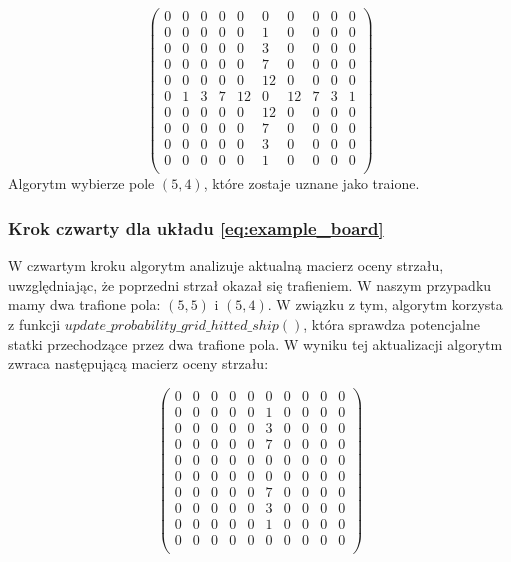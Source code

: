 \documentclass[magisterska]{pracadypl}
\begin{document}
$$
\begin{pmatrix}
0 & 0 & 0 & 0 & 0 & 0 & 0 & 0 & 0 & 0 \\
0 & 0 & 0 & 0 & 0 & 1 & 0 & 0 & 0 & 0 \\
0 & 0 & 0 & 0 & 0 & 3 & 0 & 0 & 0 & 0 \\
0 & 0 & 0 & 0 & 0 & 7 & 0 & 0 & 0 & 0 \\
0 & 0 & 0 & 0 & 0 & 12 & 0 & 0 & 0 & 0 \\
0 & 1 & 3 & 7 & 12 & 0 & 12 & 7 & 3 & 1 \\
0 & 0 & 0 & 0 & 0 & 12 & 0 & 0 & 0 & 0 \\
0 & 0 & 0 & 0 & 0 & 7 & 0 & 0 & 0 & 0 \\
0 & 0 & 0 & 0 & 0 & 3 & 0 & 0 & 0 & 0 \\
0 & 0 & 0 & 0 & 0 & 1 & 0 & 0 & 0 & 0 \\
\end{pmatrix}
$$
Algorytm wybierze pole $(5,4)$, które zostaje uznane jako traione.

\subsubsection{Krok czwarty dla układu \eqref{eq:example_board}}

 W czwartym kroku algorytm analizuje aktualną macierz oceny strzału, uwzględniając, że poprzedni strzał okazał się trafieniem. W naszym przypadku mamy dwa trafione pola: $(5,5)$ i $(5,4)$. W związku z tym, algorytm korzysta z funkcji $update\_probability\_grid\_hitted\_ship()$, która sprawdza potencjalne statki przechodzące przez dwa trafione pola. W wyniku tej aktualizacji algorytm zwraca następującą macierz oceny strzału:
 
$$
\begin{pmatrix}
0 & 0 & 0 & 0 & 0 & 0 & 0 & 0 & 0 & 0 \\
0 & 0 & 0 & 0 & 0 & 1 & 0 & 0 & 0 & 0 \\
0 & 0 & 0 & 0 & 0 & 3 & 0 & 0 & 0 & 0 \\
0 & 0 & 0 & 0 & 0 & 7 & 0 & 0 & 0 & 0 \\
0 & 0 & 0 & 0 & 0 & 0 & 0 & 0 & 0 & 0 \\
0 & 0 & 0 & 0 & 0 & 0 & 0 & 0 & 0 & 0 \\
0 & 0 & 0 & 0 & 0 & 7 & 0 & 0 & 0 & 0 \\
0 & 0 & 0 & 0 & 0 & 3 & 0 & 0 & 0 & 0 \\
0 & 0 & 0 & 0 & 0 & 1 & 0 & 0 & 0 & 0 \\
0 & 0 & 0 & 0 & 0 & 0 & 0 & 0 & 0 & 0 \\
\end{pmatrix}
$$
\end{document}
